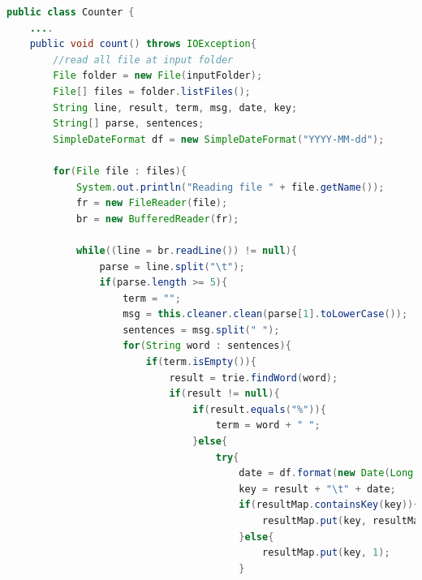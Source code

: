 \begin{lstlisting}[language=Java,basicstyle=\tiny,caption=Counter.java (Tanpa MapReduce),label={lst:kode_tanpa_mapreduce}]
public class Counter {
	....
	public void count() throws IOException{
        //read all file at input folder
        File folder = new File(inputFolder);
        File[] files = folder.listFiles();
        String line, result, term, msg, date, key;
        String[] parse, sentences;
        SimpleDateFormat df = new SimpleDateFormat("YYYY-MM-dd");
        
        for(File file : files){
            System.out.println("Reading file " + file.getName());
            fr = new FileReader(file);
            br = new BufferedReader(fr);
            
            while((line = br.readLine()) != null){
                parse = line.split("\t");
                if(parse.length >= 5){
                    term = "";
                    msg = this.cleaner.clean(parse[1].toLowerCase());
                    sentences = msg.split(" ");
                    for(String word : sentences){
                        if(term.isEmpty()){
                            result = trie.findWord(word);
                            if(result != null){
                                if(result.equals("%")){
                                    term = word + " ";
                                }else{
                                    try{
                                        date = df.format(new Date(Long.parseLong(parse[parse.length - 1])));
                                        key = result + "\t" + date;
                                        if(resultMap.containsKey(key)){
                                            resultMap.put(key, resultMap.get(key) + 1);
                                        }else{
                                            resultMap.put(key, 1);
                                        }
                                        

\end{lstlisting}
